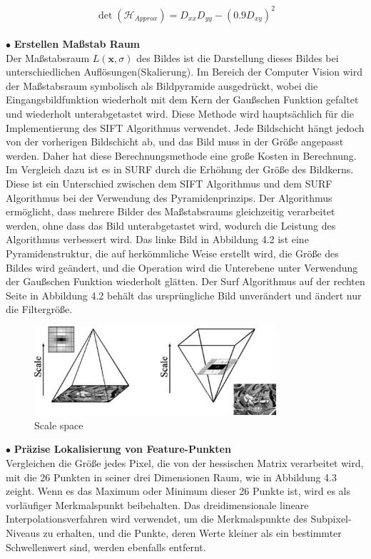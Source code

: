 \begin{equation}
   \det(\mathcal{H}_{Approx}) = D_{xx}D_{yy} - (0.9D_{xy})^2  
\end{equation}
\\
$\bullet$ \textbf{Erstellen Maßstab Raum}\\
Der Maßstabsraum $L(\textbf{x},\sigma)$ des Bildes ist die Darstellung dieses Bildes bei unterschiedlichen Auflösungen(Skalierung). Im Bereich der Computer Vision wird der Maßstabsraum symbolisch als Bildpyramide ausgedrückt, wobei die Eingangsbildfunktion wiederholt mit dem Kern der Gaußschen Funktion gefaltet und wiederholt unterabgetastet wird. Diese Methode wird hauptsächlich für die Implementierung des SIFT Algorithmus verwendet. Jede Bildschicht hängt jedoch von der vorherigen Bildschicht ab, und das Bild muss in der Größe angepasst werden. Daher hat diese Berechnungsmethode eine große Kosten in Berechnung. Im Vergleich dazu ist es in SURF durch die Erhöhung der Größe des Bildkerns. Diese ist ein Unterschied zwischen dem SIFT Algorithmus und dem SURF Algorithmus bei der Verwendung des Pyramidenprinzips.
Der Algorithmus ermöglicht, dass mehrere Bilder des Maßstabsraums gleichzeitig verarbeitet werden, ohne dass das Bild unterabgetastet wird, wodurch die Leistung des Algorithmus verbessert wird. Das linke Bild in Abbildung 4.2 ist eine Pyramidenstruktur, die auf herkömmliche Weise erstellt wird, die Größe des Bildes wird geändert, und die Operation wird die Unterebene  unter Verwendung der Gaußschen Funktion wiederholt glätten. Der Surf Algorithmus auf der rechten Seite in Abbildung 4.2 behält das ursprüngliche Bild unverändert und ändert nur die Filtergröße.

\begin{figure}[htb]
 \centering 
 \includegraphics[keepaspectratio,width=0.8\textwidth]{images/4_ZweiteErfahrung/Scale_space.pdf}
 \caption{Scale space}
 \label{fig:Scale space}
\end{figure} 


$\bullet$ \textbf{Präzise Lokalisierung von Feature-Punkten}\\
Vergleichen die Größe jedes Pixel, die von der hessischen Matrix verarbeitet wird, mit die 26 Punkten in seiner drei Dimensionen Raum, wie in Abbildung 4.3 zeight. Wenn es das Maximum oder Minimum dieser 26 Punkte ist, wird es als vorläufiger Merkmalspunkt beibehalten. Das dreidimensionale lineare Interpolationsverfahren wird verwendet, um die Merkmalspunkte des Subpixel-Niveaus zu erhalten, und die Punkte, deren Werte kleiner als ein bestimmter Schwellenwert sind, werden ebenfalls entfernt.

